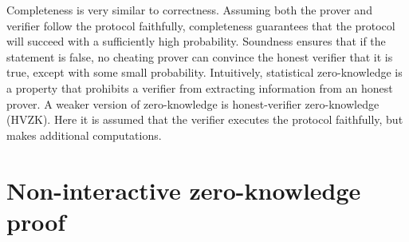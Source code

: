 Completeness is very similar to correctness. Assuming both the prover and verifier follow the protocol faithfully, completeness guarantees that the
protocol will succeed with a sufficiently high probability.
Soundness ensures that if the statement is false, no cheating prover can convince the honest verifier that it is true, except with some small probability.
Intuitively, statistical zero-knowledge is a property that prohibits a verifier from extracting information from an honest prover.
A weaker version of zero-knowledge is honest-verifier zero-knowledge (HVZK). Here it is assumed that the verifier executes the protocol faithfully,
but makes additional computations.

\section{Non-interactive zero-knowledge proof}
